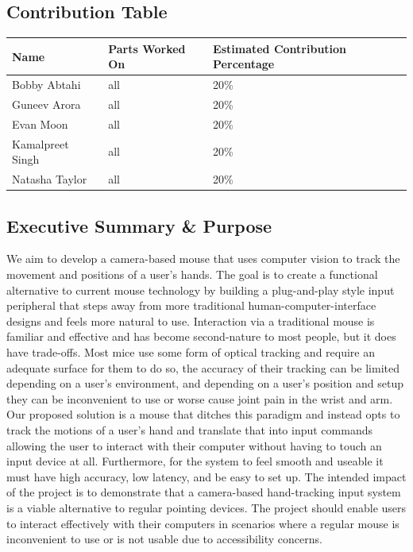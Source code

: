 \documentclass{article}
\begin{document}
\subsection{Contribution Table}

\begin{tabularx}{\textwidth}{|l|l|X|}
    \hline
    \rowcolor{lightgray}
    \textbf{Name} & \textbf{Parts Worked On} & \textbf{Estimated Contribution Percentage} \\
    \hline Bobby Abtahi     & all & 20\% \\
    \hline Guneev Arora     & all & 20\% \\
    \hline Evan Moon        & all & 20\% \\
    \hline Kamalpreet Singh & all & 20\% \\
    \hline Natasha Taylor   & all & 20\% \\
    \hline
\end{tabularx}

\subsection{Executive Summary \& Purpose}

We aim to develop a camera-based mouse that uses computer vision to track the movement and positions of a user's hands. The goal is to create a functional alternative to current mouse technology by building a plug-and-play style input peripheral that steps away from more traditional human-computer-interface designs and feels more natural to use. Interaction via a traditional mouse is familiar and effective and has become second-nature to most people, but it does have trade-offs. Most mice use some form of optical tracking and require an adequate surface for them to do so, the accuracy of their tracking can be limited depending on a user's environment, and depending on a user's position and setup they can be inconvenient to use or worse cause joint pain in the wrist and arm. Our proposed solution is a mouse that ditches this paradigm and instead opts to track the motions of a user's hand and translate that into input commands allowing the user to interact with their computer without having to touch an input device at all. Furthermore, for the system to feel smooth and useable it must have high accuracy, low latency, and be easy to set up. The intended impact of the project is to demonstrate that a camera-based hand-tracking input system is a viable alternative to regular pointing devices. The project should enable users to interact effectively with their computers in scenarios where a regular mouse is inconvenient to use or is not usable due to accessibility concerns.
\end{document}
